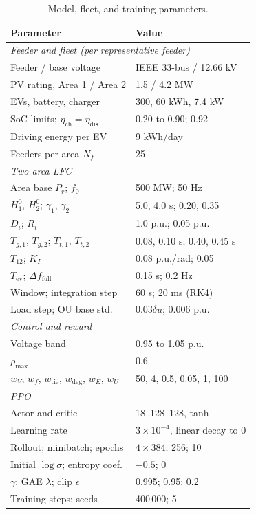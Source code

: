 \begin{table}[!t]
\caption{Model, fleet, and training parameters.}
\label{tab:params}
\centering
\footnotesize
\setlength{\tabcolsep}{3pt}
\begin{tabular}{p{}p{}}
\toprule
\textbf{Parameter} & \textbf{Value}\\
\midrule
\multicolumn{2}{l}{\emph{Feeder and fleet (per representative feeder)}}\\
Feeder / base voltage & IEEE 33-bus / 12.66 kV\\
PV rating, Area 1 / Area 2 & 1.5 / 4.2 MW\\
EVs, battery, charger & 300, 60 kWh, 7.4 kW\\
SoC limits; $\eta_{\mathrm{ch}}=\eta_{\mathrm{dis}}$ & 0.20 to 0.90; 0.92\\
Driving energy per EV & 9 kWh/day\\
Feeders per area $N_f$ & 25\\
\multicolumn{2}{l}{\emph{Two-area LFC}}\\
Area base $P_r$; $f_0$ & 500 MW; 50 Hz\\
$H_1^0$, $H_2^0$; $\gamma_1$, $\gamma_2$ & 5.0, 4.0 s; 0.20, 0.35\\
$D_i$; $R_i$ & 1.0 p.u.; 0.05 p.u.\\
$T_{g,1}$, $T_{g,2}$; $T_{t,1}$, $T_{t,2}$ & 0.08, 0.10 s; 0.40, 0.45 s\\
$T_{12}$; $K_I$ & 0.08 p.u./rad; 0.05\\
$T_{\mathrm{ev}}$; $\Delta f_{\mathrm{full}}$ & 0.15 s; 0.2 Hz\\
Window; integration step & 60 s; 20 ms (RK4)\\
Load step; OU base std. & 0.03$\delta u$; 0.006 p.u.\\
\multicolumn{2}{l}{\emph{Control and reward}}\\
Voltage band & 0.95 to 1.05 p.u.\\
$\rho_{\max}$ & 0.6\\
$w_V$, $w_f$, $w_{\mathrm{tie}}$, $w_{\mathrm{deg}}$, $w_E$, $w_U$ & 50, 4, 0.5, 0.05, 1, 100\\
\multicolumn{2}{l}{\emph{PPO}}\\
Actor and critic & 18--128--128, tanh\\
Learning rate & $3\times10^{-4}$, linear decay to 0\\
Rollout; minibatch; epochs & $4\times384$; 256; 10\\
Initial $\log\sigma$; entropy coef. & $-0.5$; 0\\
$\gamma$; GAE $\lambda$; clip $\epsilon$ & 0.995; 0.95; 0.2\\
Training steps; seeds & 400\,000; 5\\
\bottomrule
\end{tabular}
\end{table}

